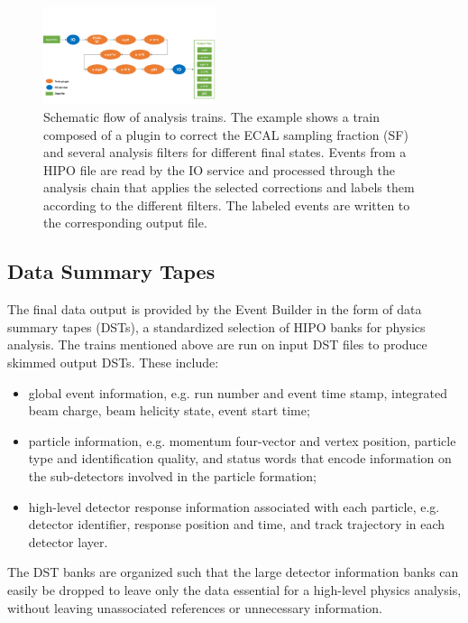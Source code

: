 \begin{figure}
    \includegraphics[width=0.45\textwidth,height=0.2\textheight]{pics/train.pdf}
    \caption{Schematic flow of analysis trains. The example shows a train composed of a plugin to correct the ECAL
      sampling fraction (SF) and several analysis filters for different final states. Events from a HIPO file are read
      by the IO service and processed through the analysis chain that applies the selected corrections and labels them
      according to the different filters. The labeled events are written to the corresponding output file.\label{fig:train}}
\end{figure}

\subsection{Data Summary Tapes}
\label{sec:dsts}

The final data output is provided by the Event Builder in the form of data summary tapes (DSTs), a standardized
selection of HIPO banks for physics analysis. The trains mentioned above are run on input DST files to produce
skimmed output DSTs. These include:

\begin{itemize}
\item global event information, e.g. run number and event time stamp, integrated beam charge, beam helicity state,
  event start time;
\item particle information, e.g. momentum four-vector and vertex position, particle type and identification quality,
  and status words that encode information on the sub-detectors involved in the particle formation;
\item high-level detector response information associated with each particle, e.g. detector identifier, response
  position and time, and track trajectory in each detector layer.
\end{itemize}

\noindent
The DST banks are organized such that the large detector information banks can easily be dropped to leave only
the data essential for a high-level physics analysis, without leaving unassociated references or unnecessary information.

